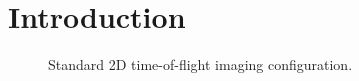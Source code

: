 \documentclass{article}
\newcommand{\vect}[1]{\bm{#1}}
\newcommand{\ser}[2]{#1^{#2}}
\theoremstyle{definition}
\begin{document}
\section{Introduction}
\label{sec_intro}
\begin{figure}[htb]
	\centering
	
	\caption{Standard 2D time-of-flight imaging configuration.}
	\label{fig_pulse_echo}
\end{figure}

\end{document}
